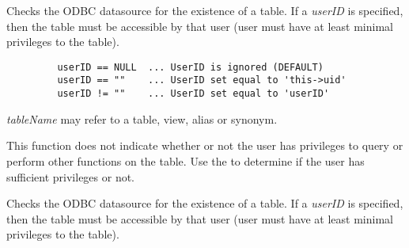 \label{wxdbtableexists}


Checks the ODBC datasource for the existence of a table.  If a {\it userID} 
is specified, then the table must be accessible by that user (user must have 
at least minimal privileges to the table).



\begin{verbatim}
         userID == NULL  ... UserID is ignored (DEFAULT)
         userID == ""    ... UserID set equal to 'this->uid'
         userID != ""    ... UserID set equal to 'userID'
\end{verbatim}


{\it tableName} may refer to a table, view, alias or synonym.

This function does not indicate whether or not the user has privileges to query or perform other functions on the table.  Use the  to determine if the user has sufficient privileges or not.




\label{wxdbtableprivileges}


Checks the ODBC datasource for the existence of a table.  If a {\it userID} 
is specified, then the table must be accessible by that user (user must have 
at least minimal privileges to the table).


